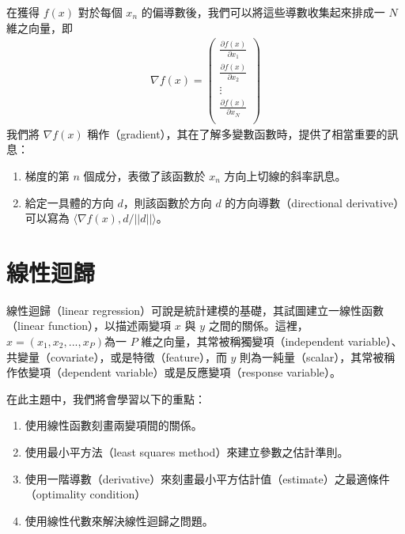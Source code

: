 \documentclass[letterpaper,10pt,english]{sphinxmanual}
\begin{document}
在獲得 \(f(x)\) 對於每個 \(x_n\) 的偏導數後，我們可以將這些導數收集起來排成一 \(N\) 維之向量，即
\begin{equation*}
\begin{split}
\nabla f(x) =
\begin{pmatrix}
\frac{\partial  f(x)}{\partial x_1} \\
\frac{\partial  f(x)}{\partial x_2} \\
\vdots \\
\frac{\partial  f(x)}{\partial x_N} \\
\end{pmatrix}
\end{split}
\end{equation*}
我們將 \(\nabla f(x)\) 稱作（gradient），其在了解多變數函數時，提供了相當重要的訊息：
\begin{enumerate}
%
\item {} 
梯度的第 \(n\) 個成分，表徵了該函數於 \(x_n\) 方向上切線的斜率訊息。

\item {} 
給定一具體的方向 \(d\)，則該函數於方向 \(d\) 的方向導數（directional derivative）可以寫為 \(\langle \nabla f(x),d/||d|| \rangle\)。

\end{enumerate}


\chapter{線性迴歸}
\label{\detokenize{notebook/linear-regression:id1}}\label{\detokenize{notebook/linear-regression::doc}}
線性迴歸（linear regression）可說是統計建模的基礎，其試圖建立一線性函數（linear function），以描述兩變項 \(x\) 與 \(y\) 之間的關係。這裡，\(x=(x_1,x_2,..., x_P)\)為一 \(P\) 維之向量，其常被稱獨變項（independent variable）、共變量（covariate），或是特徵（feature），而 \(y\) 則為一純量（scalar），其常被稱作依變項（dependent variable）或是反應變項（response variable）。

在此主題中，我們將會學習以下的重點：
\begin{enumerate}
%
\item {} 
使用線性函數刻畫兩變項間的關係。

\item {} 
使用最小平方法（least squares method）來建立參數之估計準則。

\item {} 
使用一階導數（derivative）來刻畫最小平方估計值（estimate）之最適條件（optimality condition）

\item {} 
使用線性代數來解決線性迴歸之問題。

\end{enumerate}
\end{document}
